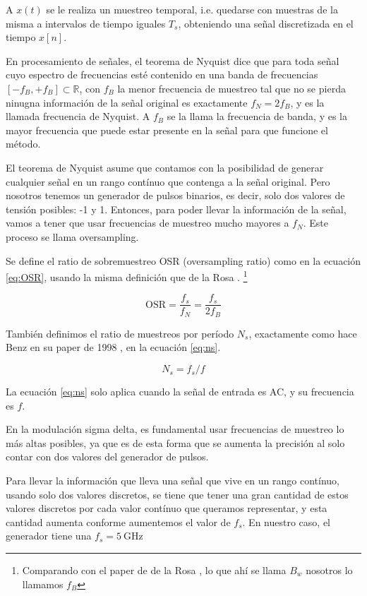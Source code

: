 \documentclass[twoside]{article}
\begin{document}
\begin{multicols}{2}
A $x(t)$ se le realiza un muestreo temporal, i.e. quedarse con muestras de la misma a intervalos de tiempo iguales $T_s$, obteniendo una señal discretizada en el tiempo $x[n]$.

En procesamiento de señales, el teorema de Nyquist \cite{oppenheim} dice que para toda señal cuyo espectro de frecuencias esté contenido en una banda de frecuencias $[-f_B,+f_B]\subset \mathbb{R}$, con $f_B$ la menor frecuencia de muestreo tal que no se pierda ninugna información de la señal original es exactamente $f_N = 2 f_B$, y es la llamada frecuencia de Nyquist. A $f_B$ se la llama la frecuencia de banda, y es la mayor frecuencia que puede estar presente en la señal para que funcione el método.

El teorema de Nyquist asume que contamos con la posibilidad de generar cualquier señal en un rango contínuo que contenga a la señal original. Pero nosotros tenemos un generador de pulsos binarios, es decir, solo dos valores de tensión posibles: -1 y 1. Entonces, para poder llevar la información de la señal, vamos a tener que usar frecuencias de muestreo mucho mayores a $f_N$. Este proceso se llama oversampling. 

Se define el ratio de sobremuestreo OSR (oversampling ratio) como en la ecuación \ref{eq:OSR}, usando la misma definición que de la Rosa \cite{delarosa2011}. \footnote{Comparando con el paper de de la Rosa \cite{delarosa2011}, lo que ahí se llama $B_w$ nosotros lo llamamos $f_B$}

\begin{equation}
    \text{OSR} = \frac{f_s}{f_N} = \frac{f_s}{2 f_B}
    \label{eq:OSR}
\end{equation}

También definimos el ratio de muestreos por período $N_s$, exactamente como hace Benz en su paper de 1998 \cite{benz1998}, en la ecuación \ref{eq:ns}.

\begin{equation}
    N_s = f_s/f
    \label{eq:ns}
\end{equation}

La ecuación \ref{eq:ns} solo aplica cuando la señal de entrada es AC, y su frecuencia es $f$.

En la modulación sigma delta, es fundamental usar frecuencias de muestreo lo más altas posibles, ya que es de esta forma que se aumenta la precisión al solo contar con dos valores del generador de pulsos. 

Para llevar la información que lleva una señal que vive en un rango contínuo, usando solo dos valores discretos, se tiene que tener una gran cantidad de estos valores discretos por cada valor contínuo que queramos representar, y esta cantidad aumenta conforme aumentemos el valor de $f_s$. En nuestro caso, el generador tiene una $f_s = \SI{5}{\giga\hertz}$




\end{multicols}
\end{document}
